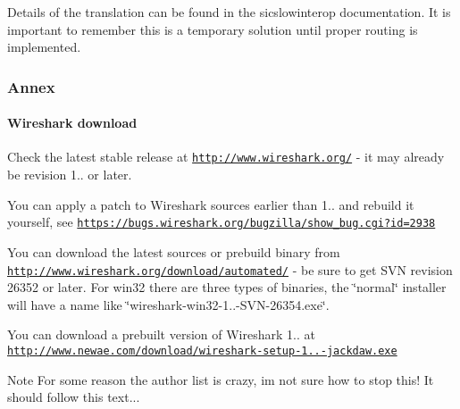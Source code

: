 Details of the translation can be found in the sicslowinterop documentation. It is important to remember this is a temporary solution until proper routing is implemented.\hypertarget{a00067_Annex}{}\subsubsection{Annex}\label{a00067_Annex}
\hypertarget{a00067_annex_wireshark}{}\paragraph{Wireshark download}\label{a00067_annex_wireshark}
\begin{DoxyItemize}
\item Check the latest stable release at \href{http://www.wireshark.org/}{\tt http\+://www.\+wireshark.\+org/} -\/ it may already be revision 1.. or later. \item You can apply a patch to Wireshark sources earlier than 1.. and rebuild it yourself, see \href{https://bugs.wireshark.org/bugzilla/show_bug.cgi?id=2938}{\tt https\+://bugs.\+wireshark.\+org/bugzilla/show\+\_\+bug.\+cgi?id=2938} \item You can download the latest sources or prebuild binary from \href{http://www.wireshark.org/download/automated/}{\tt http\+://www.\+wireshark.\+org/download/automated/} -\/ be sure to get S\+VN revision 26352 or later. For win32 there are three types of binaries, the \char`\"{}normal\char`\"{} installer will have a name like \char`\"{}wireshark-\/win32-\/1..-\/\+S\+V\+N-\/26354.\+exe\char`\"{}. \item You can download a prebuilt version of Wireshark 1.. at \href{http://www.newae.com/download/wireshark-setup-1.0.3-jackdaw.exe}{\tt http\+://www.\+newae.\+com/download/wireshark-\/setup-\/1..-\/jackdaw.\+exe}\end{DoxyItemize}
\begin{DoxyNote}{Note}
For some reason the author list is crazy, i\textquotesingle{}m not sure how to stop this! It should follow this text... 
\end{DoxyNote}
